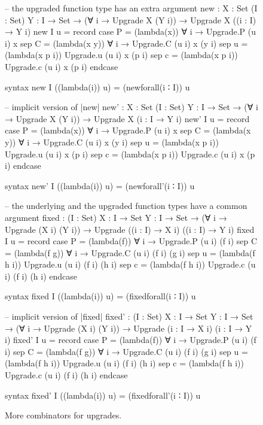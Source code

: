 \begin{figure}
\codefigure\small
{}\parskip
\begin{code}
-- the upgraded function type has an extra argument
new :  {X : Set} (I : Set) {Y : I → Set} →
       (∀ i → Upgrade X (Y i)) → Upgrade X ((i : I) → Y i)
new I u = record  case  P  =  (lambda(x)) ∀ i → Upgrade.P (u i) x
                  sep   C  =  (lambda(x y)) ∀ i → Upgrade.C (u i) x (y i)
                  sep   u  =  (lambda(x p i)) Upgrade.u  (u i) x (p i)
                  sep   c  =  (lambda(x p i)) Upgrade.c  (u i) x (p i) endcase

syntax new I ((lambda(i)) u) = (newforall(i ∶ I)) u

-- implicit version of |new|
new' :  {X : Set} (I : Set) {Y : I → Set} →
        (∀ i → Upgrade X (Y i)) → Upgrade X ({i : I} → Y i)
new' I u = record  case  P  =  (lambda(x)) ∀ {i} → Upgrade.P (u i) x
                   sep   C  =  (lambda(x y)) ∀ {i} → Upgrade.C (u i) x (y {i})
                   sep   u  =  (lambda(x p {i})) Upgrade.u  (u i) x (p {i})
                   sep   c  =  (lambda(x p {i})) Upgrade.c  (u i) x (p {i}) endcase

syntax new' I ((lambda(i)) u) = (newforall'(i ∶ I)) u

-- the underlying and the upgraded function types have a common argument
fixed :  (I : Set) {X : I → Set} {Y : I → Set} →
         (∀ i → Upgrade (X i) (Y i)) → Upgrade ((i : I) → X i) ((i : I) → Y i)
fixed I u = record  case  P  =  (lambda(f)) ∀ i → Upgrade.P (u i) (f i)
                    sep   C  =  (lambda(f g)) ∀ i → Upgrade.C (u i) (f i) (g i)
                    sep   u  =  (lambda(f h i)) Upgrade.u  (u i) (f i) (h i)
                    sep   c  =  (lambda(f h i)) Upgrade.c  (u i) (f i) (h i) endcase

syntax fixed I ((lambda(i)) u) = (fixedforall(i ∶ I)) u

-- implicit version of |fixed|
fixed' :  (I : Set) {X : I → Set} {Y : I → Set} →
          (∀ i → Upgrade (X i) (Y i)) → Upgrade ({i : I} → X i) ({i : I} → Y i)
fixed' I u = record  case  P     =  (lambda(f)) ∀ {i} → Upgrade.P (u i) (f {i})
                     sep   C     =  (lambda(f g)) ∀ {i} → Upgrade.C (u i) (f {i}) (g {i})
                     sep   u     =  (lambda(f h {i})) Upgrade.u  (u i) (f {i}) (h {i}) 
                     sep   c     =  (lambda(f h {i})) Upgrade.c  (u i) (f {i}) (h {i}) endcase

syntax fixed' I ((lambda(i)) u) = (fixedforall'(i ∶ I)) u
\end{code}
\parskip
\caption{More combinators for upgrades.}
\label{fig:upgrade-combinators}
\end{figure}

